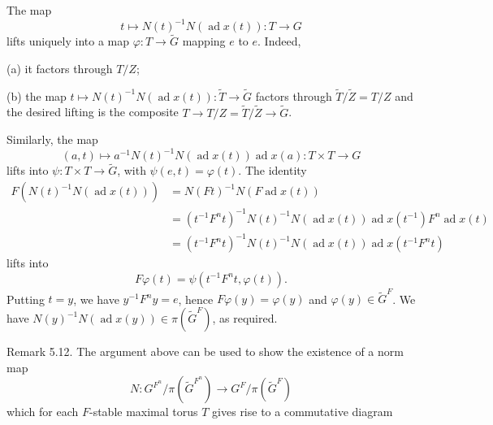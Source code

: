 \documentclass[9pt,twoside]{extarticle}
\begin{document}
{The map \[
t\longmapsto N(t)^{-1}N(\operatorname{ad}x(t)):T\longrightarrow G
\] lifts uniquely into a map \(\varphi:T\to\widetilde G\) mapping \(e\) to \(e\). Indeed,\par

(a) it factors through \(T/Z\);\par

(b) the map \(t\mapsto N(t)^{-1}N(\operatorname{ad}x(t)):\widetilde T\to\widetilde G\) factors through \(\widetilde T/\widetilde Z=T/Z\) and the desired lifting is the composite \(T\to T/Z=\widetilde T/\widetilde Z\to\widetilde G\).\par

Similarly, the map \[
(a,t)\longmapsto a^{-1}N(t)^{-1}N(\operatorname{ad}x(t))\operatorname{ad}x(a):T\times T\longrightarrow G
\] lifts into \(\psi:T\times T\to\widetilde G\), with \(\psi(e,t)=\varphi(t)\). The identity \[
\begin{aligned}
F(N(t)^{-1}N(\operatorname{ad}x(t)))
&=N(Ft)^{-1}N(F\operatorname{ad}x(t))\\
&=(t^{-1}F^nt)^{-1}N(t)^{-1}N(\operatorname{ad}x(t))\operatorname{ad}x(t^{-1})F^n\operatorname{ad}x(t)\\
&=(t^{-1}F^nt)^{-1}N(t)^{-1}N(\operatorname{ad}x(t))\operatorname{ad}x(t^{-1}F^nt)
\end{aligned}
\] lifts into \[
F\varphi(t)=\psi(t^{-1}F^nt,\varphi(t)).
\] Putting \(t=y\), we have \(y^{-1}F^ny=e\), hence \(F\varphi(y)=\varphi(y)\) and \(\varphi(y)\in\widetilde G^F\). We have \(N(y)^{-1}N(\operatorname{ad}x(y))\in\pi(\widetilde G^F)\), as required.\par

Remark 5.12. The argument above can be used to show the existence of a norm map \[
N:G^{F^n}/\pi(\widetilde G^{F^n})\longrightarrow G^F/\pi(\widetilde G^F)
\] which for each \(F\)-stable maximal torus \(T\) gives rise to a commutative diagram\par
}
\end{document}
